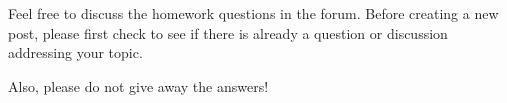 


Feel free to discuss the homework questions in the forum.  Before creating a new post, please first check to see if there is already a question
or discussion addressing your topic.  

Also, please do not give away the answers!  

\endedxtext


\endedxvertical





